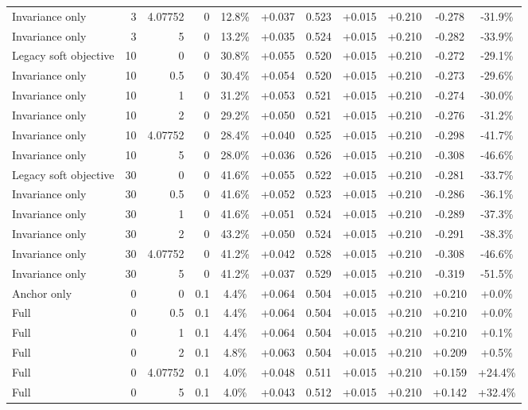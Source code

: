 \begin{table}[htbp]
\begin{tabular}{lrrrccccccc}
Invariance only & 3 & 4.07752 & 0 & 12.8\% & +0.037 & 0.523 & +0.015 & +0.210 & -0.278 & -31.9\% \\
Invariance only & 3 & 5 & 0 & 13.2\% & +0.035 & 0.524 & +0.015 & +0.210 & -0.282 & -33.9\% \\
Legacy soft objective & 10 & 0 & 0 & 30.8\% & +0.055 & 0.520 & +0.015 & +0.210 & -0.272 & -29.1\% \\
Invariance only & 10 & 0.5 & 0 & 30.4\% & +0.054 & 0.520 & +0.015 & +0.210 & -0.273 & -29.6\% \\
Invariance only & 10 & 1 & 0 & 31.2\% & +0.053 & 0.521 & +0.015 & +0.210 & -0.274 & -30.0\% \\
Invariance only & 10 & 2 & 0 & 29.2\% & +0.050 & 0.521 & +0.015 & +0.210 & -0.276 & -31.2\% \\
Invariance only & 10 & 4.07752 & 0 & 28.4\% & +0.040 & 0.525 & +0.015 & +0.210 & -0.298 & -41.7\% \\
Invariance only & 10 & 5 & 0 & 28.0\% & +0.036 & 0.526 & +0.015 & +0.210 & -0.308 & -46.6\% \\
Legacy soft objective & 30 & 0 & 0 & 41.6\% & +0.055 & 0.522 & +0.015 & +0.210 & -0.281 & -33.7\% \\
Invariance only & 30 & 0.5 & 0 & 41.6\% & +0.052 & 0.523 & +0.015 & +0.210 & -0.286 & -36.1\% \\
Invariance only & 30 & 1 & 0 & 41.6\% & +0.051 & 0.524 & +0.015 & +0.210 & -0.289 & -37.3\% \\
Invariance only & 30 & 2 & 0 & 43.2\% & +0.050 & 0.524 & +0.015 & +0.210 & -0.291 & -38.3\% \\
Invariance only & 30 & 4.07752 & 0 & 41.2\% & +0.042 & 0.528 & +0.015 & +0.210 & -0.308 & -46.6\% \\
Invariance only & 30 & 5 & 0 & 41.2\% & +0.037 & 0.529 & +0.015 & +0.210 & -0.319 & -51.5\% \\
Anchor only & 0 & 0 & 0.1 & 4.4\% & +0.064 & 0.504 & +0.015 & +0.210 & +0.210 & +0.0\% \\
Full & 0 & 0.5 & 0.1 & 4.4\% & +0.064 & 0.504 & +0.015 & +0.210 & +0.210 & +0.0\% \\
Full & 0 & 1 & 0.1 & 4.4\% & +0.064 & 0.504 & +0.015 & +0.210 & +0.210 & +0.1\% \\
Full & 0 & 2 & 0.1 & 4.8\% & +0.063 & 0.504 & +0.015 & +0.210 & +0.209 & +0.5\% \\
Full & 0 & 4.07752 & 0.1 & 4.0\% & +0.048 & 0.511 & +0.015 & +0.210 & +0.159 & +24.4\% \\
Full & 0 & 5 & 0.1 & 4.0\% & +0.043 & 0.512 & +0.015 & +0.210 & +0.142 & +32.4\% \\

\end{tabular}
\end{table}
